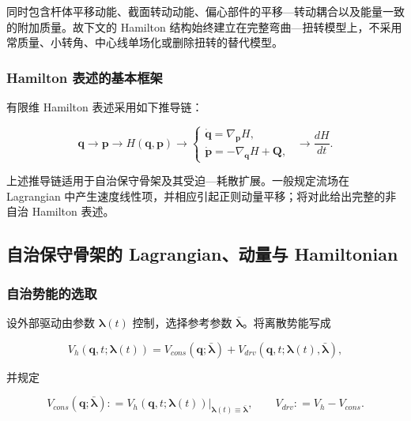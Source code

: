 同时包含杆体平移动能、截面转动动能、偏心部件的平移---转动耦合以及能量一致的附加质量。故下文的 Hamilton 结构始终建立在完整弯曲---扭转模型上，不采用常质量、小转角、中心线单场化或删除扭转的替代模型。

\subsubsection{Hamilton 表述的基本框架}\label{sec:hamiltonian-3-1-2}

有限维 Hamilton 表述采用如下推导链：\cite{MarsdenRatiu1999MechanicsSymmetry,Arnold1989ClassicalMechanics}

\begin{equation}
\label{eq:hamiltonian-3-4}
\mathbf{q} \rightarrow \mathbf{p} \rightarrow H\left( \mathbf{q},\mathbf{p} \right) \rightarrow \left\{ \begin{matrix}
\dot{\mathbf{q}} = \nabla_{\mathbf{p}}H, \\
\dot{\mathbf{p}} = - \nabla_{\mathbf{q}}H + \mathbf{Q},
\end{matrix} \right.\ \  \rightarrow \frac{dH}{dt}.
\end{equation}

上述推导链适用于自治保守骨架及其受迫---耗散扩展。一般规定流场在 Lagrangian 中产生速度线性项，并相应引起正则动量平移；将对此给出完整的非自治 Hamilton 表述。

\subsection{自治保守骨架的 Lagrangian、动量与 Hamiltonian}\label{sec:hamiltonian-3-2}

\subsubsection{自治势能的选取}\label{sec:hamiltonian-3-2-1}

设外部驱动由参数 \(\bm{\lambda}(t)\) 控制，选择参考参数 \(\bar{\bm{\lambda}}\)。将离散势能写成

\begin{equation}
\label{eq:hamiltonian-3-5}
V_{h}\left( \mathbf{q},t;\bm{\lambda}(t) \right) = V_{cons}\left( \mathbf{q};\bar{\bm{\lambda}} \right) + V_{drv}\left( \mathbf{q},t;\bm{\lambda}(t),\bar{\bm{\lambda}} \right),
\end{equation}

并规定

\begin{equation}
\label{eq:hamiltonian-3-6}
V_{cons}\left( \mathbf{q};\bar{\bm{\lambda}} \right): = V_{h}\left( \mathbf{q},t;\bm{\lambda}(t) \right)|_{\bm{\lambda}(t) \equiv \bar{\bm{\lambda}}},\quad\quad V_{drv}: = V_{h} - V_{cons}.
\end{equation}

